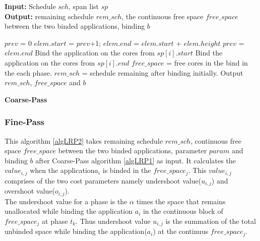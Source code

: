 \documentclass[10pt, conference]{IEEEtran}
\begin{document}
\begin{algorithm}[tb]
\footnotesize
\textbf{Input:} Schedule $sch$, span list $sp$ \ \\
\textbf{Output:} remaining schedule $rem\_sch$, the continuous free space $free\_space$ between the two binded applications, binding $b$
\begin{algorithmic}[1]
\STATE  $prev$ = 0
\STATE $elem.start$ = $prev$+1; $elem.end$ = $elem.start$ + $elem.height$
\STATE $prev$ = $elem.end$
\ENDFOR    
{} 
\STATE Bind the application on the cores from $sp[i].start$
\ELSE   
\STATE Bind the application on the cores from $sp[i].end$
\ENDIF
\STATE $free\_space$ = free cores in the bind in the each phase.   
\STATE $rem\_sch$ = schedule remaining after binding initially.
\ENDFOR
\STATE Output $rem\_sch$, $free\_space$ and $b$
\end{algorithmic}
\caption{\textbf{Coarse-Pass}}
\vspace{-0.1cm}
\label{algLRP1}
\end{algorithm}

\subsubsection{Fine-Pass}
This algorithm \ref{algLRP2} takes remaining schedule $rem\_sch$, continuous free space $free\_space$ between the two binded applications, parameter $param$ and binding $b$ after Coarse-Pass algorithm \ref{algLRP1} as input. It calculates the $value_{i,j}$ when the application$a_i$ is binded in the $free\_space_j$. This $value_{i,j}$ comprises of the two cost parameters namely undershoot value($u_{i,j}$) and overshoot value($o_{i,j}$). \ \\
The undershoot value for a phase is the $\alpha$ times the space that remains unallocated while binding the application $a_i$ in the continuous block of $free\_space_j$ at phase $t_k$. Thus undershoot value $u_{i,j}$ is the summation of the total unbinded space while binding the application($a_i$) at the continuus $free\_space_j$.
\end{document}
